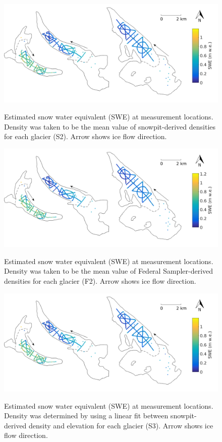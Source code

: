 \documentclass[12pt]{article}
\begin{document}
\begin{figure}[H]
	\centering
	\includegraphics[width =\textwidth]{SWEmap_opt4.png}\\
	\caption{Estimated snow water equivalent (SWE) at measurement locations. Density was taken to be the mean value of snowpit-derived densities for each glacier (S2). Arrow shows ice flow direction.}
	\label{fig:SWEmap_S2}
\end{figure}

\begin{figure}[H]
	\centering
	\includegraphics[width = \textwidth]{SWEmap_opt5.png}\\
	\caption{Estimated snow water equivalent (SWE) at measurement locations. Density was taken to be the mean value of Federal Sampler-derived densities for each glacier (F2). Arrow shows ice flow direction.}
	\label{fig:SWEmap_F2}
\end{figure}

\begin{figure}[H]
	\centering
	\includegraphics[width = \textwidth]{SWEmap_opt6.png}\\
	\caption{Estimated snow water equivalent (SWE) at measurement locations. Density was determined by using a linear fit between snowpit-derived density and elevation for each glacier (S3). Arrow shows ice flow direction.}
	\label{fig:SWEmap_S3}
\end{figure}
\end{document}
